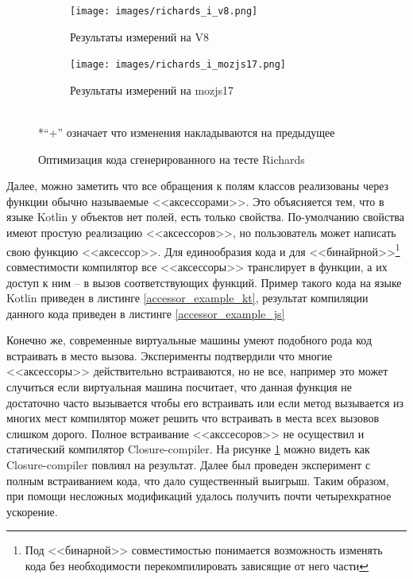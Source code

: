 \begin{figure}[ht!]
\centering
	\begin{subfigure}[b]{0.7\textwidth}
	\centering
	\texttt{[image: images/richards\_i\_v8.png]}
	\caption{Результаты измерений на V8}
    \end{subfigure}

  	\begin{subfigure}[b]{0.7\textwidth}
	\centering
	\texttt{[image: images/richards\_i\_mozjs17.png]}
	\caption{Результаты измерений на mozjs17}
    \end{subfigure}
\\*``+'' означает что изменения накладываются на предыдущее
\caption{Оптимизация кода сгенерированного на тесте Richards}
\label{richards_i}
\end{figure}


Далее, можно заметить что все обращения к полям классов реализованы через функции обычно называемые <<аксессорами>>. Это объясняется тем, что в языке Kotlin у объектов нет полей, есть только свойства. По-умолчанию свойства имеют простую реализацию <<аксессоров>>, но пользователь может написать свою функцию <<аксессор>>. Для единообразия кода и для <<бинайрной>>\footnote{Под <<бинарной>> совместимостью понимается возможность изменять кода без необходимости перекомпилировать зависящие от него части}
совместимости компилятор все <<аксессоры>> транслирует в функции, а их доступ к ним -- в вызов соответствующих функций. Пример такого кода на языке Kotlin приведен в листинге \ref{accessor_example_kt}, результат компиляции данного кода приведен в листинге \ref{accessor_example_js}

\begin{code}
\end{code}

Конечно же, современные виртуальные машины умеют подобного рода код встраивать в место вызова. Эксперименты подтвердили что многие <<аксессоры>> действительно встраиваются, но не все, например это может случиться если виртуальная машина посчитает, что данная функция не достаточно часто вызывается чтобы его встраивать или если  метод вызывается из многих мест компилятор может решить что встраивать в места всех вызовов слишком дорого. 
Полное встраивание <<акссесоров>> не осуществил и статический компилятор Closure-compiler. На рисунке \ref{richards_i} можно видеть как Closure-compiler повлиял на результат.
Далее был проведен эксперимент с полным встраиванием кода, что дало существенный выигрыш. Таким образом, при помощи несложных модификаций удалось получить почти четырехкратное ускорение. 

